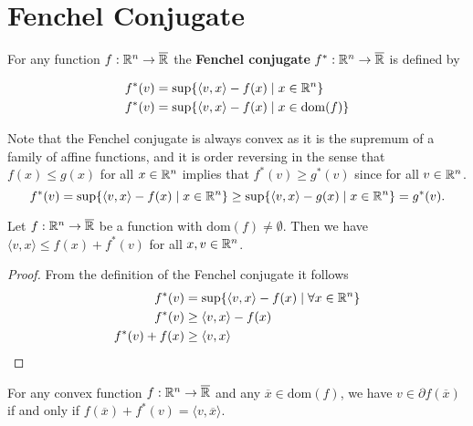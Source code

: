 \chapter{Fenchel Conjugate}

\begin{definition}
For any function $f: \Bbb R^n \rightarrow \overline{\Bbb R}$ the \textbf{Fenchel conjugate} $f^*: \Bbb R^n \rightarrow \overline{\Bbb R}$ is defined by

\begin{align*}
f^*(v) &= \mathrm{sup}\{\langle v, x \rangle - f(x) \mid x \in \Bbb R^n \} \\
f^*(v) &= \mathrm{sup}\{\langle v, x \rangle - f(x) \mid x \in \mathrm{dom}(f) \}
\end{align*}

Note that the Fenchel conjugate is always convex as it is the supremum of a family of affine functions, and it is order reversing in the sense that $f(x) \leq g(x)$ for all $x \in \Bbb R^n$ implies that $f^*(v) \geq g^*(v)$ since for all $v \in \Bbb R^n$.
\begin{equation*}
f^*(v) = \mathrm{sup}\{\langle v, x \rangle - f(x) \mid x \in \Bbb R^n \} \geq \mathrm{sup}\{\langle v, x \rangle - g(x) \mid x \in \Bbb R^n \} = g^*(v).
\end{equation*}

\begin{lemma}
Let $f: \Bbb R^n \rightarrow \overline{\Bbb R}$ be a function with $\mathrm{dom}(f) \neq \emptyset$. Then we have $\langle v, x \rangle \leq f(x) + f^*(v)$ for all $x, v \in \Bbb R^n$.
\end{lemma}

\begin{proof}
From the definition of the Fenchel conjugate it follows
\begin{align*}
f^*(v) &= \mathrm{sup}\{ \langle v, x \rangle - f(x) \mid \forall x \in \Bbb R^n \}
 \\
f^*(v) &\geq \langle v, x \rangle - f(x) \\
f^*(v) + f(x) &\geq \langle v, x \rangle
\end{align*}

\end{proof}

\begin{theorem}
For any convex function $f: \Bbb R^n \rightarrow \overline{\Bbb R}$ and any $\overline{x} \in \mathrm{dom}(f)$, we have $v \in \partial f(\overline{x})$ if and only if $f(\overline{x}) + f^*(v) = \langle v, \overline{x} \rangle$.
\end{theorem}


\end{definition}
